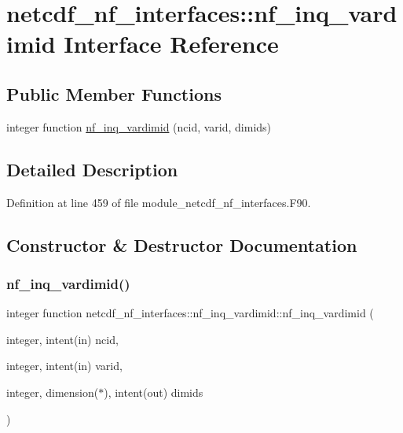 \hypertarget{interfacenetcdf__nf__interfaces_1_1nf__inq__vardimid}{}\section{netcdf\+\_\+nf\+\_\+interfaces\+:\+:nf\+\_\+inq\+\_\+vardimid Interface Reference}
\label{interfacenetcdf__nf__interfaces_1_1nf__inq__vardimid}
\subsection*{Public Member Functions}
\begin{DoxyCompactItemize}
\item 
integer function \hyperlink{interfacenetcdf__nf__interfaces_1_1nf__inq__vardimid_af2860b72ef601d1fc5082364b146c83c}{nf\+\_\+inq\+\_\+vardimid} (ncid, varid, dimids)
\end{DoxyCompactItemize}


\subsection{Detailed Description}


Definition at line 459 of file module\+\_\+netcdf\+\_\+nf\+\_\+interfaces.\+F90.



\subsection{Constructor \& Destructor Documentation}
\mbox{\label{interfacenetcdf__nf__interfaces_1_1nf__inq__vardimid_af2860b72ef601d1fc5082364b146c83c}} 
\subsubsection{\texorpdfstring{nf\+\_\+inq\+\_\+vardimid()}{nf\_inq\_vardimid()}}
{\footnotesize\ttfamily integer function netcdf\+\_\+nf\+\_\+interfaces\+::nf\+\_\+inq\+\_\+vardimid\+::nf\+\_\+inq\+\_\+vardimid (\begin{DoxyParamCaption}\item[{integer, intent(in)}]{ncid,  }\item[{integer, intent(in)}]{varid,  }\item[{integer, dimension($\ast$), intent(out)}]{dimids }\end{DoxyParamCaption})}



